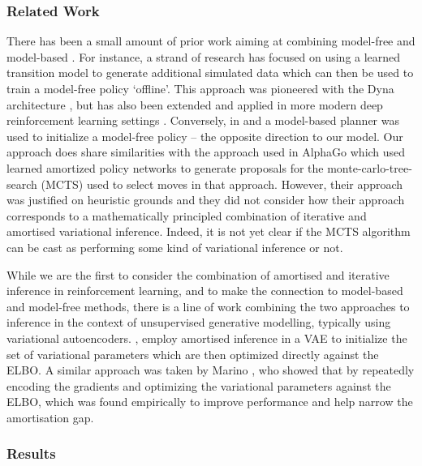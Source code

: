 \subsubsection{Related Work}

There has been a small amount of prior work aiming at combining model-free and model-based 
\citep{li2020robot,che2018combining}. For instance, a strand of research has focused on using a learned transition model to generate additional simulated data which can then be used to train a model-free policy `offline'. This approach was pioneered with the Dyna architecture \citep{sutton1991dyna}, but has also been extended and applied in more modern deep reinforcement learning settings \citep{gu2016continuous}. Conversely, in \citep{farshidian2014learning} and \citep{nagabandi2018neural} a model-based planner was used to initialize a model-free policy -- the opposite direction to our model. Our approach does share similarities with the approach used in AlphaGo \citep{silver2017mastering} which used learned amortized policy networks to generate proposals for the monte-carlo-tree-search (MCTS) used to select moves in that approach. However, their approach was justified on heuristic grounds and they did not consider how their approach corresponds to a mathematically principled combination of iterative and amortised variational inference. Indeed, it is not yet clear if the MCTS algorithm can be cast as performing some kind of variational inference or not.

While we are the first to consider the combination of amortised and iterative inference in reinforcement learning, and to make the connection to model-based and model-free methods, there is a line of work combining the two approaches to inference in the context of unsupervised generative modelling, typically using variational autoencoders. \citep{kim_emi:_2018}, employ amortised inference in a VAE to initialize the set of variational parameters which are then optimized directly against the ELBO. A similar approach was taken by Marino \citep{marino2018iterative}, who showed that by repeatedly encoding the gradients and optimizing the variational parameters against the ELBO, which was found empirically to improve performance and help narrow the amortisation gap.

\subsubsection{Results}


